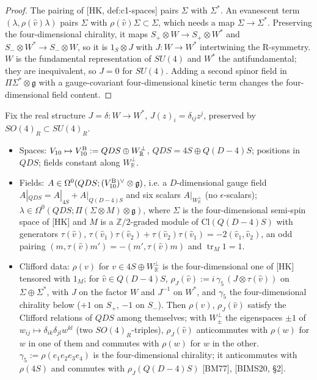 \begin{proof}
The pairing of [HK, def:c1-spaces] pairs $\Sigma$ with $\Sigma^*$. An evanescent term $(\lambda,\rho(\hat v)\lambda)$ pairs $\Sigma$ with $\rho(\hat v)\Sigma\subset\Sigma$, which needs a map $\Sigma\to\Sigma^*$. Preserving the four-dimensional chirality, it maps $S_+\otimes W\to S_+\otimes W^*$ and $S_-\otimes W^*\to S_-\otimes W$, so it is $1_{S}\otimes J$ with $J\colon W\to W^*$ intertwining the R-symmetry. $W$ is the fundamental representation of $SU(4)$ and $W^*$ the antifundamental; they are inequivalent, so $J=0$ for $SU(4)$. Adding a second spinor field in $\Pi\Sigma^*\otimes\mathfrak g$ with a gauge-covariant four-dimensional kinetic term changes the four-dimensional field content.
\end{proof}

\begin{definition}[Scheme B]
\label{def:schemeB}
Fix the real structure $J=\delta\colon W\to W^*$, $J(z)_i=\delta_{ij}z^j$, preserved by $SO(4)_R\subset SU(4)_R$.
\begin{itemize}
\item Spaces: $V_{10}\mapsto V_{10}^{\rm B}:=QDS\oplus W^\perp_{\mathbb R}$, $QDS=4S\oplus Q(D{-}4)S$; positions in $QDS$; fields constant along $W^\perp_{\mathbb R}$.
\item Fields: $A\in\Omega^0(QDS;(V_{10}^{\rm B})^\vee\otimes\mathfrak g)$, i.e. a $D$-dimensional gauge field $A|_{QDS}=A|_{4S}+A|_{Q(D-4)S}$ and six scalars $A|_{W^\perp_{\mathbb R}}$ (no $\epsilon$-scalars); $\lambda\in\Omega^0(QDS;\Pi(\Sigma\otimes M)\otimes\mathfrak g)$, where $\Sigma$ is the four-dimensional semi-spin space of [HK] and $M$ is a $\mathbb Z/2$-graded module of $\mathrm{Cl}(Q(D{-}4)S)$ with generators $\tau(\hat v)$, $\tau(\hat v_1)\tau(\hat v_2)+\tau(\hat v_2)\tau(\hat v_1)=-2(\hat v_1,\hat v_2)$, an odd pairing $(m,\tau(\hat v)m')=-(m',\tau(\hat v)m)$ and $\operatorname{tr}_M1=1$.
\item Clifford data: $\rho(v)$ for $v\in 4S\oplus W^\perp_{\mathbb R}$ is the four-dimensional one of [HK] tensored with $1_M$; for $\hat v\in Q(D{-}4)S$, $\rho_J(\hat v):=i\,\gamma_5\,(J\otimes\tau(\hat v))$ on $\Sigma\oplus\Sigma^*$, with $J$ on the factor $W$ and $J^{-1}$ on $W^*$, and $\gamma_5$ the four-dimensional chirality below ($+1$ on $S_+$, $-1$ on $S_-$). Then $\rho(v)$, $\rho_J(\hat v)$ satisfy the Clifford relations of $QDS$ among themselves; with $W^\perp_\pm$ the eigenspaces $\pm1$ of $w_{ij}\mapsto\delta_{ik}\delta_{jl}w^{kl}$ (two $SO(4)_R$-triples), $\rho_J(\hat v)$ anticommutes with $\rho(w)$ for $w$ in one of them and commutes with $\rho(w)$ for $w$ in the other. $\gamma_5:=\rho(e_1e_2e_3e_4)$ is the four-dimensional chirality; it anticommutes with $\rho(4S)$ and commutes with $\rho_J(Q(D{-}4)S)$ [BM77], [BIMS20, §2].

\end{itemize}
\end{definition}
